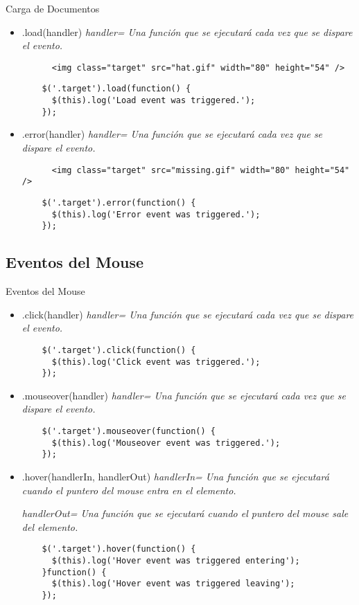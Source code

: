 \begin{frame}[fragile]{Carga de Documentos} %
\begin{itemize}
    \item .load(handler) \textit{ handler= Una función que se ejecutará cada vez que se dispare el evento.}
    \begin{lstlisting}
      <img class="target" src="hat.gif" width="80" height="54" />
    \end{lstlisting}
    \begin{lstlisting}
    $('.target').load(function() {
      $(this).log('Load event was triggered.');
    });
    \end{lstlisting}
    \item .error(handler) \textit{ handler= Una función que se ejecutará cada vez que se dispare el evento.} 
    \begin{lstlisting}
      <img class="target" src="missing.gif" width="80" height="54" />
    \end{lstlisting}
    \begin{lstlisting}
    $('.target').error(function() {
      $(this).log('Error event was triggered.');
    });
    \end{lstlisting}
\end{itemize}
\end{frame}

\subsection{Eventos del Mouse} %

\begin{frame}[fragile]{Eventos del Mouse} %
\begin{itemize}
    \item .click(handler) \textit{ handler= Una función que se ejecutará cada vez que se dispare el evento.}
    \begin{lstlisting}
    $('.target').click(function() {
      $(this).log('Click event was triggered.');
    });
    \end{lstlisting}
    \item .mouseover(handler) \textit{ handler= Una función que se ejecutará cada vez que se dispare el evento.} 
    \begin{lstlisting}
    $('.target').mouseover(function() {
      $(this).log('Mouseover event was triggered.');
    });
    \end{lstlisting}
    \item .hover(handlerIn, handlerOut) \textit{ handlerIn= Una función que se
    ejecutará cuando el puntero del mouse entra en el elemento.} 

    \textit{ handlerOut= Una función que se ejecutará cuando el puntero del mouse sale del elemento.} 
    \begin{lstlisting}
    $('.target').hover(function() {
      $(this).log('Hover event was triggered entering');
    }function() {
      $(this).log('Hover event was triggered leaving');
    });
    \end{lstlisting}
\end{itemize}
\end{frame}

